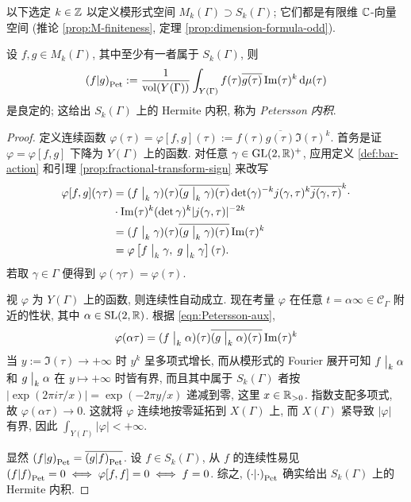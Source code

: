 以下选定 $k \in \mathbb{Z}$ 以定义模形式空间 $M_k(\Gamma) \supset S_k(\Gamma)$; 它们都是有限维 $\mathbb{C}$-向量空间 (推论 \ref{prop:M-finiteness}, 定理 \ref{prop:dimension-formula-odd}).

\begin{definition-theorem}\label{def:Petersson}  
	设 $f, g \in M_k(\Gamma)$, 其中至少有一者属于 $S_k(\Gamma)$, 则
	\[ \left( f \middle| g \right)_{\mathrm{Pet}} := \dfrac{1}{\operatorname{vol}(Y(\Gamma))} \int_{Y(\Gamma)} f(\tau) \overline{g(\tau)} \operatorname{Im}(\tau)^k \mathop{}\!\mathrm{d}\mu(\tau) \]
	是良定的; 这给出 $S_k(\Gamma)$ 上的 Hermite 内积, 称为 \emph{Petersson 内积}.
\end{definition-theorem}
\begin{proof}
	定义连续函数 $\varphi(\tau) = \varphi[f,g](\tau) := f(\tau) \overline{g(\tau)} \Im(\tau)^k$. 首务是证 $\varphi = \varphi[f,g]$ 下降为 $Y(\Gamma)$ 上的函数. 对任意 $\gamma \in \operatorname{GL}(2,\mathbb{R})^+$, 应用定义 \ref{def:bar-action} 和引理 \ref{prop:fractional-transform-sign} 来改写
	\begin{equation}\label{eqn:Petersson-aux} \begin{aligned}
		\varphi[f,g](\gamma\tau) & = (f \;\big|_{k} \; \gamma)(\tau) \overline{(g \;\big|_{k} \; \gamma)(\tau)} \det(\gamma)^{-k} j(\gamma, \tau)^k \overline{j(\gamma, \tau)}^k \cdot \\
		& \cdot \operatorname{Im}(\tau)^k (\det\gamma)^k |j(\gamma,\tau)|^{-2k} \\
		& = (f \;\big|_{k} \; \gamma)(\tau) \overline{(g \;\big|_{k} \; \gamma)(\tau)} \operatorname{Im}(\tau)^k \\
		& = \varphi\left[ f \;\big|_{k} \; \gamma, \; g \;\big|_{k} \; \gamma \right](\tau).
	\end{aligned}\end{equation}
	若取 $\gamma \in \Gamma$ 便得到 $ \varphi(\gamma\tau) = \varphi(\tau)$.

	视 $\varphi$ 为 $Y(\Gamma)$ 上的函数, 则连续性自动成立. 现在考量 $\varphi$ 在任意 $t = \alpha\infty \in \mathcal{C}_\Gamma$ 附近的性状, 其中 $\alpha \in \operatorname{SL}(2,\mathbb{R})$. 根据 \eqref{eqn:Petersson-aux},
	\[ \varphi(\alpha\tau) = (f \;\big|_{k} \; \alpha)(\tau) \overline{(g \;\big|_{k} \; \alpha)(\tau)} \operatorname{Im}(\tau)^k \]
	当 $y := \Im(\tau) \to +\infty$ 时 $y^k$ 呈多项式增长, 而从模形式的 Fourier 展开可知 $f \;\big|_{k} \; \alpha$ 和 $g \;\big|_{k} \; \alpha$ 在 $y \mapsto +\infty$ 时皆有界, 而且其中属于 $S_k(\Gamma)$ 者按 $|\exp(2\pi i\tau/x)| = \exp(-2\pi y/x)$ 递减到零, 这里 $x \in \mathbb{R}_{>0}$. 指数支配多项式, 故 $\varphi(\alpha\tau) \to 0$. 这就将 $\varphi$ 连续地按零延拓到 $X(\Gamma)$ 上, 而 $X(\Gamma)$ 紧导致 $|\varphi|$ 有界, 因此 $\int_{Y(\Gamma)} |\varphi| < + \infty$.
	
	显然 $\left( f \middle| g \right)_{\mathrm{Pet}} = \overline{\left( g \middle| f \right)_{\mathrm{Pet}}}$. 设 $f \in S_k(\Gamma)$, 从 $f$ 的连续性易见 $\left( f \middle| f \right)_{\mathrm{Pet}} = 0 \iff \varphi[f,f] = 0 \iff f=0$. 综之, $\left( \cdot \middle| \cdot \right)_{\mathrm{Pet}}$ 确实给出 $S_k(\Gamma)$ 上的 Hermite 内积.
\end{proof}

